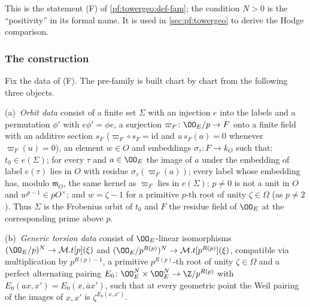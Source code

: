 This is the statement (F) of \cref{pf:towergeo:def-fam}; the condition $N>0$ is the ``positivity'' in its formal
name. It is used in \cref{sec:pf:towergeo} to derive the Hodge comparison.

\subsubsection*{The construction}
Fix the data of (F). The pre-family is built chart by chart from the following three objects.

\begin{definition}\label{pf:tower:def-orbit}
(a)~\emph{Orbit data} consist of a finite set $\Sigma$ with an injection $e$ into the labels and a permutation $\phi'$ with
$e\phi'=\phi e$, a surjection $\varpi_F\colon\OO_E/p\to F$ onto a finite field with an additive section $s_F$
($\varpi_F\circ s_F=\mathrm{id}$ and $u\,s_F(a)=0$ whenever $\varpi_F(u)=0$), an element $w\in O$ and embeddings
$\sigma_\tau\colon F\to k_O$ such that: $t_0\in e(\Sigma)$; for every $\tau$ and $a\in\OO_E$ the image of $a$ under the
embedding of label $e(\tau)$ lies in $O$ with residue $\sigma_\tau(\varpi_F(a))$; every label whose embedding has, modulo
$\mathfrak m_O$, the same kernel as $\varpi_F$ lies in $e(\Sigma)$; $p\ne0$ is not a unit in $O$ and $w^{p-1}\in pO^\times$;
and $w=\zeta-1$ for a primitive $p$-th root of unity $\zeta\in\Omega$ (as $p\ne2$). Thus $\Sigma$ is the Frobenius orbit of
$t_0$ and $F$ the residue field of $\OO_E$ at the corresponding prime above $p$.

(b)~\emph{Generic torsion data} consist of $\OO_E$-linear isomorphisms $(\OO_E/p)^N\to\mathcal M.t[p](\xi)$ and
$(\OO_E/p^{R(p)})^N\to\mathcal M.t[p^{R(p)}](\xi)$, compatible via multiplication by $p^{R(p)-1}$, a primitive
$p^{R(p)}$-th root of unity $\zeta\in\Omega$ and a perfect alternating pairing $E_0\colon\OO_E^N\times\OO_E^N\to\Z/p^{R(p)}$
with $E_0(ax,x')=E_0(x,\bar ax')$, such that at every geometric point the Weil pairing of the images of $x,x'$ is
$\zeta^{E_0(x,x')}$.


\end{definition}
